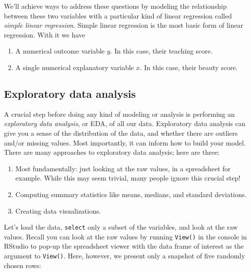 \documentclass[12pt, krantz2,]{krantz}
\makeatletter
\newenvironment{Shaded}{\begin{snugshade}}{\end{snugshade}}
\newcommand{\KeywordTok}[1]{\textcolor[rgb]{0.27,0.27,0.27}{\textbf{#1}}}
\newcommand{\NormalTok}[1]{#1}
\newcommand{\OperatorTok}[1]{\textcolor[rgb]{0.43,0.43,0.43}{\textbf{#1}}}
\newcommand{\StringTok}[1]{\textcolor[rgb]{0.5,0.5,0.5}{#1}}
\providecommand{\tightlist}{%
  \setlength{\itemsep}{0pt}\setlength{\parskip}{0pt}}
\newenvironment{kframe}{%
\medskip{}
\setlength{\fboxsep}{.8em}
 \def\at@end@of@kframe{}%
 \ifinner\ifhmode%
  \def\at@end@of@kframe{\end{minipage}}%
  \begin{minipage}{\columnwidth}%
 \fi\fi%
 \def\FrameCommand##1{\hskip\@totalleftmargin \hskip-\fboxsep
 \colorbox{shadecolor}{##1}\hskip-\fboxsep
     \hskip-\linewidth \hskip-\@totalleftmargin \hskip\columnwidth}%
 \MakeFramed {\advance\hsize-\width
   \@totalleftmargin\z@ \linewidth\hsize
   \@setminipage}}%
 {\par\unskip\endMakeFramed%
 \at@end@of@kframe}
\renewenvironment{Shaded}{\begin{kframe}}{\end{kframe}}
\makeatother
\begin{document}
We'll achieve ways to address these questions by modeling the relationship between these two variables with a particular kind of linear regression called \emph{simple linear regression}. Simple linear regression is the most basic form of linear regression. With it we have

\begin{enumerate}
\def\labelenumi{\arabic{enumi}.}
\tightlist
\item
  A numerical outcome variable \(y\). In this case, their teaching score.
\item
  A single numerical explanatory variable \(x\). In this case, their beauty score.
\end{enumerate}

\hypertarget{model1EDA}{%
\subsection{Exploratory data analysis}\label{model1EDA}}

A crucial step before doing any kind of modeling or analysis is performing an \emph{exploratory data analysis}, or EDA, of all our data. Exploratory data analysis can give you a sense of the distribution of the data, and whether there are outliers and/or missing values. Most importantly, it can inform how to build your model. There are many approaches to exploratory data analysis; here are three:

\begin{enumerate}
\def\labelenumi{\arabic{enumi}.}
\tightlist
\item
  Most fundamentally: just looking at the raw values, in a spreadsheet for example. While this may seem trivial, many people ignore this crucial step!
\item
  Computing summary statistics like means, medians, and standard deviations.
\item
  Creating data visualizations.
\end{enumerate}

Let's load the data, \texttt{select} only a subset of the variables, and look at the raw values. Recall you can look at the raw values by running \texttt{View()} in the console in RStudio to pop-up the spreadsheet viewer with the data frame of interest as the argument to \texttt{View()}. Here, however, we present only a snapshot of five randomly chosen rows:

\begin{Shaded}
\end{Shaded}
\end{document}
